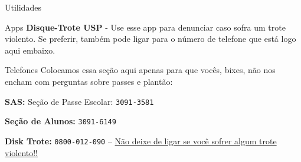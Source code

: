\begin{secao}{Utilidades}
\begin{subsecao}{Apps}
{\bf Disque-Trote USP} - Use esse app para denunciar caso sofra um trote violento. Se
preferir, também pode ligar para o número de telefone que está logo aqui embaixo.

\end{subsecao}

\begin{subsecao}{Telefones}
Colocamos essa seção aqui apenas para que vocês, bixes, não nos encham com perguntas
sobre passes e plantão:

{\bf SAS:} Seção de Passe Escolar: {\tt 3091-3581}

{\bf Seção de Alunos:} {\tt 3091-6149}

{\bf Disk Trote:} {\tt 0800-012-090} -- \underline{Não deixe de ligar se você sofrer algum trote violento!!}


\end{subsecao}
\end{secao}
